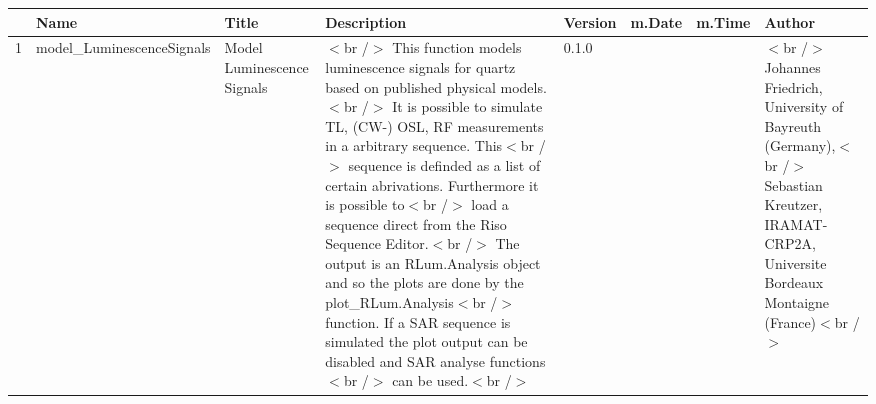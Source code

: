 \begin{table}[ht]
\centering
\begin{tabular}{rlllllll}
  \hline
 & Name & Title & Description & Version & m.Date & m.Time & Author \\ 
  \hline
1 & model\_LuminescenceSignals & Model Luminescence Signals & $<$br /$>$ This function models luminescence signals for quartz based on published physical models.$<$br /$>$ It is possible to simulate TL, (CW-) OSL, RF measurements in a arbitrary sequence. This$<$br /$>$ sequence is definded as a list of certain abrivations. Furthermore it is possible to$<$br /$>$ load a sequence direct from the Riso Sequence Editor.$<$br /$>$ The output is an RLum.Analysis object and so the plots are done by the plot\_RLum.Analysis$<$br /$>$ function. If a SAR sequence is simulated the plot output can be disabled and SAR analyse functions$<$br /$>$ can be used.$<$br /$>$ & 0.1.0
 &  &  & $<$br /$>$ Johannes Friedrich, University of Bayreuth (Germany),$<$br /$>$ Sebastian Kreutzer, IRAMAT-CRP2A, Universite Bordeaux Montaigne (France)$<$br /$>$ \\ 
   \hline
\end{tabular}
\end{table}

